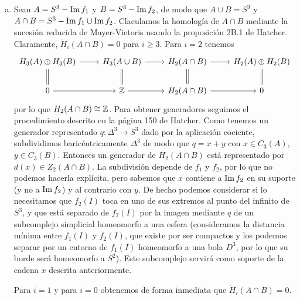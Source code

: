 \documentclass[twoside]{article}
\begin{document}
\begin{solucion}
\begin{enumerate}[(a)]
\item Sean $A=S^3-\operatorname{Im} f_1$ y $B=S^3-\operatorname{Im} f_2$, de modo que $A\cup B=S^3$ y $A\cap B=S^3-\operatorname{Im} f_1\cup \operatorname{Im} f_2$. Claculamos la homología de $A\cap B$ mediante la sucesión reducida de Mayer-Vietoris usando la proposición 2B.1 de Hatcher. Claramente, $\widetilde{H}_i(A\cap B)=0$ para $i\geq 3$. Para $i=2$ tenemos
\[
\begin{tikzcd}
H_3(A)\oplus H_3(B)\arrow[r]\arrow[d, equals] & H_3(A\cup B)\arrow[r]\arrow[d, equals] & H_2(A\cap B)\arrow[r]\arrow[d,equals] & H_2(A)\oplus H_2(B)\arrow[d, equals]\\
0 \arrow[r] & \Z\arrow[r] & H_2(A\cap B)\arrow[r] & 0
\end{tikzcd}
\]
por lo que $H_2(A\cap B)\cong \mathbb{Z}$. Para obtener generadores seguimos el procedimiento descrito en la página 150 de Hatcher. Como tenemos un generador representado $q:\Delta^3\to S^3$ dado por la aplicación cociente, subdividimos baricéntricamente $\Delta^3$ de modo que $q=x+y$ con $x\in C_3(A)$, $y\in C_3(B)$. Entonces un generador de $H_2(A\cap B)$ está representado por $d(x)\in Z_2(A\cap B)$. La subdivisión depende de $f_1$ y $f_2$, por lo que no podemos hacerla explícita, pero sabemos que $x$ contiene a $\operatorname{Im} f_2$ en su suporte (y no a $\operatorname{Im} f_2$) y al contrario con $y$. De hecho podemos considerar si lo necesitamos que $f_2(I)$ toca en uno de sus extremos al punto del infinito de $S^3$, y que está separado de $f_2(I)$ por la imagen mediante $q$ de un subcomplejo simplicial homeomorfo a una esfera (consideramos la distancia mínima entre $f_1(I)$ y $f_2(I)$, que existe por ser compactos y los podemos separar por un entorno de $f_1(I)$ homeomorfo a una bola $D^3$, por lo que su borde será homeomorfo a $S^2$). Este subcomplejo servirá como soporte de la cadena $x$ descrita anteriormente.

Para $i=1$ y para $i=0$ obtenemos de forma inmediata que $\widetilde{H}_i(A\cap B)=0$. 



\end{enumerate}
\end{solucion}
\end{document}
